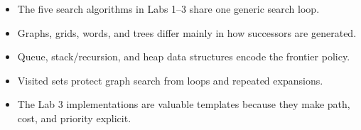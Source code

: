 \begin{chapterrecap}
\begin{itemize}
  \item The five search algorithms in Labs 1--3 share one generic search loop.
  \item Graphs, grids, words, and trees differ mainly in how successors are generated.
  \item Queue, stack/recursion, and heap data structures encode the frontier policy.
  \item Visited sets protect graph search from loops and repeated expansions.
  \item The Lab 3 implementations are valuable templates because they make path, cost, and priority explicit.
\end{itemize}
\end{chapterrecap}
